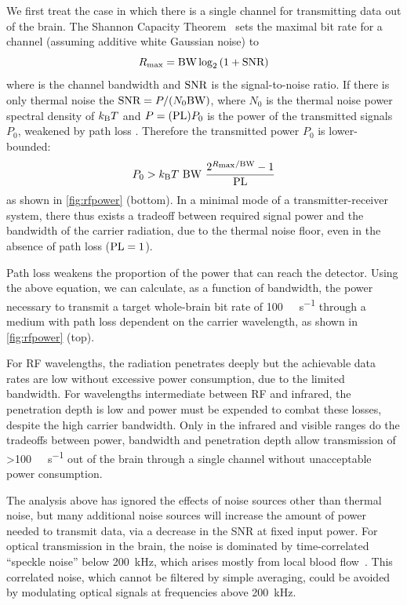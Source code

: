 We first treat the case in which there is a single channel for transmitting data out of the brain. The Shannon Capacity Theorem~\cite{cover06} sets the maximal bit rate for a channel (assuming additive white Gaussian noise) to
\[R_{\text{\scriptsize max}} = \text{BW} \log_2 \left(1 + \text{SNR}\right)\]
where \BW is the channel bandwidth and $\text{SNR}$ is the signal-to-noise ratio.
If there is only thermal noise the $\text{SNR} = P/(N_0 \text{BW})$, where $N_0$ is the thermal noise power spectral density of $k_{\text{\scriptsize B}} T$ and $P=(\text{PL})P_0$ is the power of the transmitted signals $P_0$, weakened by path loss \pathloss.
Therefore the transmitted power $P_0$ is lower-bounded:
\[P_0 > \kb T\ \BW\ \frac{2^{R\sub{max}/\BW}-1}{\pathloss}\]
as shown in \autoref{fig:rfpower} (bottom).
In a minimal mode of a transmitter-receiver system, there thus exists a tradeoff between required signal power and the bandwidth of the carrier radiation, due to the thermal noise floor, even in the absence of path loss ($\text{PL} = 1$).

Path loss weakens the proportion of the power that can reach the detector.
Using the above equation, we can calculate, as a function of bandwidth, the power necessary to transmit a target whole-brain bit rate of \SI{100}{\giga\bit\per\second} through a medium with path loss dependent on the carrier wavelength, as shown in \autoref{fig:rfpower} (top).

For RF wavelengths, the radiation penetrates deeply but the achievable data rates are low without excessive power consumption, due to the limited bandwidth.
For wavelengths intermediate between RF and infrared, the penetration depth is low and power must be expended to combat these losses, despite the high carrier bandwidth.
Only in the infrared and visible ranges do the tradeoffs between power, bandwidth and penetration depth allow transmission of \SI{>100}{\giga\bit\per\second} out of the brain through a single channel without unacceptable power consumption.

The analysis above has ignored the effects of noise sources other than thermal noise, but many additional noise sources will increase the amount of power needed to transmit data, via a decrease in the SNR at fixed input power.
For optical transmission in the brain, the noise is dominated by time-correlated ``speckle noise'' below \SI{200}{\kilo\hertz}, which arises mostly from local blood flow~\cite{carp11}.
This correlated noise, which cannot be filtered by simple averaging, could be avoided by modulating optical signals at frequencies above \SI{200}{\kHz}.

